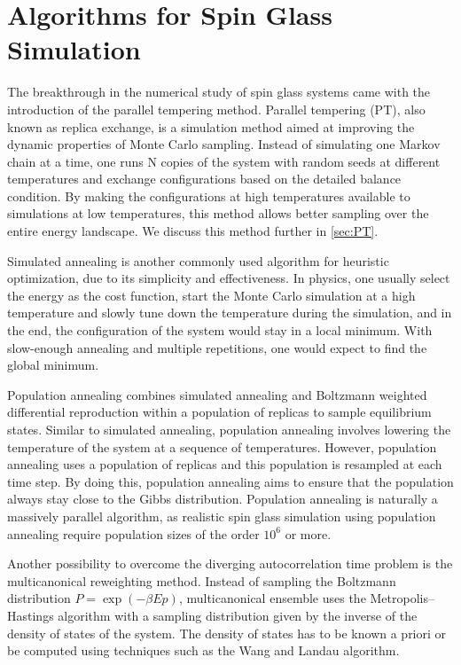 \section{Algorithms for Spin Glass Simulation}
The breakthrough in the numerical study of spin glass systems came with the 
introduction of the parallel tempering method. Parallel tempering (PT), also known
as replica exchange, is a simulation method aimed at improving the dynamic 
properties of Monte Carlo sampling. Instead of simulating one Markov chain at 
a time, one runs N copies of the system with random seeds at different 
temperatures and exchange configurations based on the detailed balance condition.
By making the configurations at high temperatures available to simulations at 
low temperatures, this method allows better sampling over the entire energy
landscape. We discuss this method further in \ref{sec:PT}.

Simulated annealing is another commonly used algorithm for heuristic optimization,
due to its simplicity and effectiveness. In physics, one usually select the 
energy as the cost function, start the Monte Carlo simulation at a high temperature
and slowly tune down the temperature during the simulation, and in the end, the
configuration of the system would stay in a local minimum. With slow-enough annealing
and multiple repetitions, one would expect to find the global minimum.  

Population annealing combines simulated annealing and Boltzmann weighted 
differential reproduction within a population of replicas to sample equilibrium 
states. Similar to simulated annealing, population annealing involves lowering 
the temperature of the system at a sequence of temperatures. However, population annealing uses a 
population of replicas and this population is resampled at each time step.
By doing this, population annealing aims to ensure that the population always stay close to the 
Gibbs distribution. Population annealing is naturally a massively
parallel algorithm, as realistic spin glass simulation using population 
annealing require population sizes of the order $10^6$ or more.

Another possibility to overcome the diverging autocorrelation time problem is the 
multicanonical reweighting method. Instead of sampling the Boltzmann 
distribution $P=\exp(-\beta Ep)$, multicanonical ensemble uses the 
Metropolis–Hastings algorithm with a sampling distribution given by the inverse 
of the density of states of the system. The density of states has to be known 
a priori or be computed using techniques such as the Wang and Landau algorithm.



